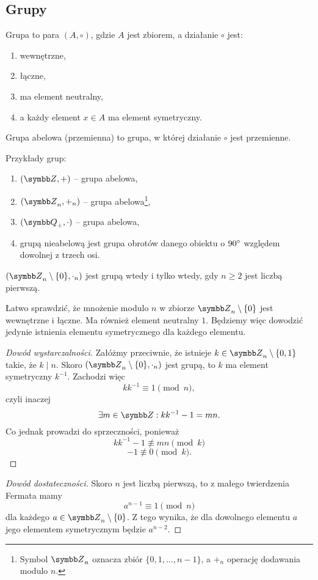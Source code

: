 \subsection{Grupy}
\begin{definition}
    Grupa to para $(A, \circ)$, gdzie $A$ jest zbiorem, a działanie $\circ$ jest:
    \begin{enumerate}
        \item wewnętrzne,
        \item łączne,
        \item ma element neutralny,
        \item a każdy element $x \in A$ ma element symetryczny.
    \end{enumerate}
\end{definition}

\begin{definition}
    Grupa abelowa (przemienna) to grupa, w której działanie $\circ$ jest przemienne.
\end{definition}

\begin{example}
    Przykłady grup:
    \begin{enumerate}
        \item $(\ZZ, +)$ -- grupa abelowa,
        \item $(\ZZ_n, +_n)$ -- grupa abelowa\footnote{Symbol $\ZZ_n$ oznacza zbiór $\{0, 1, \ldots, n-1\}$, a $+_n$ operację dodawania modulo $n$.},
        \item $(\QQ_+, \cdot)$ -- grupa abelowa,
        \item grupą nieabelową jest grupa obrotów danego obiektu o $90^\circ$ względem dowolnej z trzech osi.
    \end{enumerate}
\end{example}

\begin{theorem}
    \label{t:prime_n->group}
    $(\ZZ_n \setminus \{0\}, \cdot_n)$ jest grupą wtedy i tylko wtedy, gdy $n \geq 2$ jest liczbą pierwszą.
\end{theorem}
Łatwo sprawdzić, że mnożenie modulo $n$ w zbiorze $\ZZ_n \setminus \{0\}$ jest wewnętrzne i łączne. Ma również element neutralny $1$. Będziemy więc dowodzić jedynie istnienia elementu symetrycznego dla każdego elementu.
\begin{proof}[Dowód wystarczalności]\renewcommand{\qedsymbol}{}
    Załóżmy przeciwnie, że istnieje $k \in \ZZ_n \setminus \{0, 1\}$ takie, że $k \mid n$. Skoro $(\ZZ_n \setminus \{0\}, \cdot_n)$ jest grupą, to $k$ ma element symetryczny $k^{-1}$. Zachodzi więc
    \[ kk^{-1} \equiv 1 \pmod{n}, \]
    czyli inaczej
    \[ \exists m \in \ZZ : kk^{-1} - 1 = mn. \]
    Co jednak prowadzi do sprzeczności, ponieważ
    \[ kk^{-1} - 1 \not\equiv mn \pmod{k} \]
    \[ - 1 \not\equiv 0 \pmod{k}. \]
\end{proof}
\begin{proof}[Dowód dostateczności]
    Skoro $n$ jest liczbą pierwszą, to z małego twierdzenia Fermata mamy
    \[ a^{n-1} \equiv 1 \pmod{n} \]
    dla każdego $a \in \ZZ_n \setminus \{0\}$.
    Z tego wynika, że dla dowolnego elementu $a$ jego elementem symetrycznym będzie $a^{n-2}$.
\end{proof}

